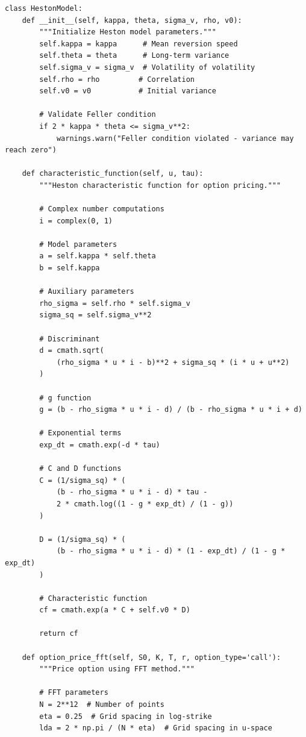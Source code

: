 \documentclass[12pt,a4paper]{article}
\theoremstyle{definition}
\theoremstyle{remark}
\begin{document}
\begin{lstlisting}[caption=Heston Model Implementation]
class HestonModel:
    def __init__(self, kappa, theta, sigma_v, rho, v0):
        """Initialize Heston model parameters."""
        self.kappa = kappa      # Mean reversion speed
        self.theta = theta      # Long-term variance
        self.sigma_v = sigma_v  # Volatility of volatility
        self.rho = rho         # Correlation
        self.v0 = v0           # Initial variance
        
        # Validate Feller condition
        if 2 * kappa * theta <= sigma_v**2:
            warnings.warn("Feller condition violated - variance may reach zero")
    
    def characteristic_function(self, u, tau):
        """Heston characteristic function for option pricing."""
        
        # Complex number computations
        i = complex(0, 1)
        
        # Model parameters
        a = self.kappa * self.theta
        b = self.kappa
        
        # Auxiliary parameters
        rho_sigma = self.rho * self.sigma_v
        sigma_sq = self.sigma_v**2
        
        # Discriminant
        d = cmath.sqrt(
            (rho_sigma * u * i - b)**2 + sigma_sq * (i * u + u**2)
        )
        
        # g function
        g = (b - rho_sigma * u * i - d) / (b - rho_sigma * u * i + d)
        
        # Exponential terms
        exp_dt = cmath.exp(-d * tau)
        
        # C and D functions
        C = (1/sigma_sq) * (
            (b - rho_sigma * u * i - d) * tau - 
            2 * cmath.log((1 - g * exp_dt) / (1 - g))
        )
        
        D = (1/sigma_sq) * (
            (b - rho_sigma * u * i - d) * (1 - exp_dt) / (1 - g * exp_dt)
        )
        
        # Characteristic function
        cf = cmath.exp(a * C + self.v0 * D)
        
        return cf
    
    def option_price_fft(self, S0, K, T, r, option_type='call'):
        """Price option using FFT method."""
        
        # FFT parameters
        N = 2**12  # Number of points
        eta = 0.25  # Grid spacing in log-strike
        lda = 2 * np.pi / (N * eta)  # Grid spacing in u-space
        

\end{lstlisting}
\end{document}
